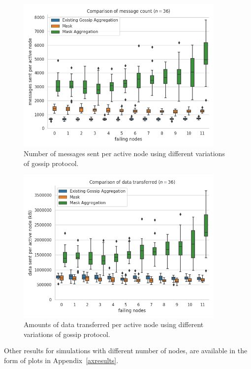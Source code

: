 \begin{figure}[H]
    \centering
    \includegraphics[width=0.91\textwidth]{images/aggregation_bandwidth_msg_tx_sum_36.png}
    \caption{Number of messages sent per active node using different variations of gossip protocol.}
    \label{fig1num}
\end{figure}

\begin{figure}[H]
    \centering
    \includegraphics[width=0.91\textwidth]{images/aggregation_bandwidth_tx_sum_36.png}
    \caption{Amounts of data transferred per active node using different variations of gossip protocol.}
    \label{fig1data}
\end{figure}


Other results for simulations with different number of nodes, are available in the form of plots in Appendix~\ref{axresults}.

